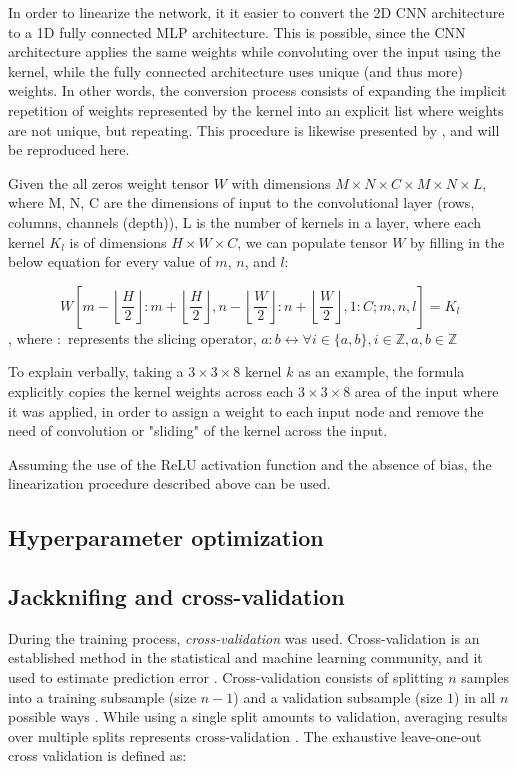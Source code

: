 In order to linearize the network, it it easier to convert the 2D CNN architecture to a 1D fully connected MLP architecture. This is possible, since the CNN architecture applies the same weights while convoluting over the input using the kernel, while the fully connected architecture uses unique (and thus more) weights. In other words, the conversion process consists of expanding the implicit repetition of weights represented by the kernel into an explicit list where weights are not unique, but repeating. This procedure is likewise presented by \textcite{keshishianEstimatingInterpretingNonlinear2020}, and will be reproduced here.

Given the all zeros weight tensor $W$ with dimensions $M \times N \times C \times M \times N \times L$, where M, N, C are the dimensions of input to the convolutional layer (rows, columns, channels (depth)), L is the number of kernels in a layer, where each kernel $K_l$ is of dimensions $H \times W \times C$, we can populate tensor $W$ by filling in the below equation for every value of $m$, $n$, and $l$:

\begin{equation}
	W\left[m - \left\lfloor\frac{H}{2}\right\rfloor:m+ \left\lfloor\frac{H}{2}\right\rfloor, n- \left\lfloor\frac{W}{2}\right\rfloor:n+ \left\lfloor\frac{W}{2}\right\rfloor, 1:C; m, n, l\right] = K_l
\end{equation} 
\noindent , where $:$ represents the slicing operator, $a:b \leftrightarrow \forall i \in \{a, b\}, i \in \mathbb{Z}, a, b \in \mathbb{Z}$

To explain verbally, taking a $3 \times 3 \times 8$ kernel $k$ as an example, the formula explicitly copies the kernel weights across each $3 \times 3 \times 8$ area of the input where it was applied, in order to assign a weight to each input node and remove the need of convolution or "sliding" of the kernel across the input.

Assuming the use of the ReLU activation function and the absence of bias, the linearization procedure described above can be used.

\subsection{Hyperparameter optimization}
\todo

\subsection{Jackknifing and cross-validation}
During the training process, \emph{cross-validation} was used. Cross-validation is an established method in the statistical and machine learning community, and it used to estimate prediction error \parencite{batesCrossValidationWhatDoes2024}. Cross-validation consists of splitting $n$ samples  into a training subsample (size $n-1$) and a validation subsample (size $1$) in all $n$ possible ways \parencite{stoneCrossValidatoryChoiceAssessment1974}.  While using a single split amounts to validation, averaging results over multiple splits represents cross-validation \parencite{arlotSurveyCrossvalidationProcedures2010}. The exhaustive leave-one-out cross validation is defined as:

